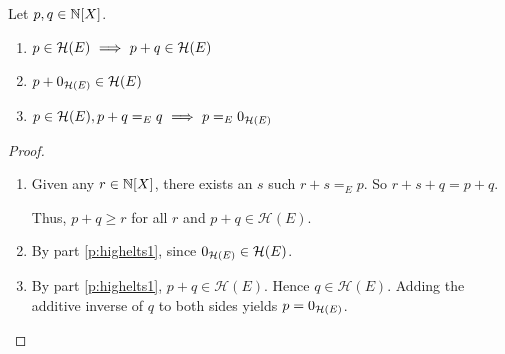 \documentclass[numbers=enddot]{scrartcl}
\newcommand{\highring}{\mathcal{H}(E)}
\begin{document}
\begin{prop} Let $p,q \in \mathbb{N}[X]$.
  \label{p:highelts}
  \begin{enumerate}
    \item \label{p:highelts1} $p \in \highring \then p + q \in \highring$
    \item \label{p:highelts2} $p + \highzero \in \highring$
    \item \label{p:highelts3} $p \in \highring, p + q =_E q \then p =_E \highzero$ 
  \end{enumerate}
\end{prop}
\begin{proof}
  \begin{enumerate}
    \item Given any $r \in \mathbb{N}[X]$, there exists an $s$ such $r + s =_E p$. So $r + s + q = p + q$.

      Thus, $p + q \ge r$ for all $r$ and $p + q \in \highring$.
    \item By part \ref{p:highelts1}, since $\highzero \in \highring$.
    \item By part \ref{p:highelts1}, $p + q \in \highring$. Hence $q \in \highring$. Adding the additive inverse of $q$ to both sides
yields $p = \highzero$. \qedhere
  \end{enumerate}
\end{proof}
\end{document}

